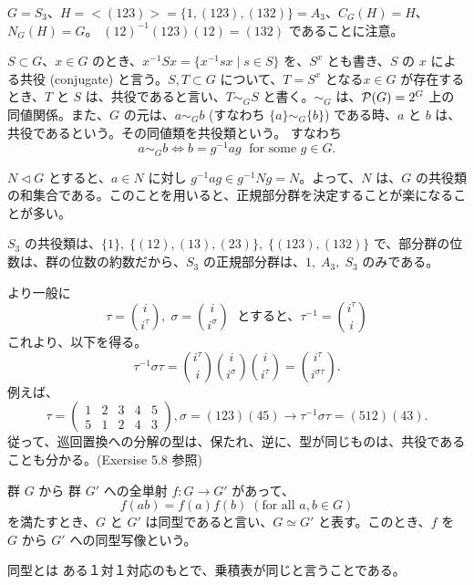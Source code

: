 \begin{eg}
$G = S_3$、$H = <(123)> = \{1,(123),(132)\} = A_3$、$C_G(H) = H$、$N_G(H) = G$。
$(12)^{-1}(123)(12) = (132)$ であることに注意。
\end{eg}

$S \subset G$、$x\in G$ のとき、$x^{-1}Sx = \{x^{-1}sx\mid s\in S\}$ を、$S^x$ とも書き、$S$ の $x$ による共役 (conjugate) と言う。$S, T\subset G$ について、$T = S^x$ となる$x\in G$ が存在するとき、$T$ と $S$ は、共役であると言い、$T\sim_G S$ と書く。$\sim_G$ は、${\cal P}(G) = 2^G$ 上の同値関係。また、$G$ の元は、$a\sim_G b$ (すなわち $\{a\}\sim_G \{b\}$) である時、$a$ と $b$ は、共役であるという。その同値類を共役類という。
すなわち 
$$a\sim_G b\Leftrightarrow b = g^{-1}ag\;\mbox{ for some }g\in G.$$

$N\lhd G$ とすると、$a\in N$ に対し $g^{-1}ag \in g^{-1}Ng = N$。よって、$N$ は、$G$ の共役類の和集合である。このことを用いると、正規部分群を決定することが楽になることが多い。

\begin{eg}
$S_3$ の共役類は、$\{1\}, \;\{(12),(13),(23)\}, \;\{(123),(132)\}$ で、部分群の位数は、群の位数の約数だから、$S_3$ の正規部分群は、$1,\;A_3, \;S_3$ のみである。

\smallskip
より一般に
$$\tau = {i \choose i^{\tau}},\;\sigma = {i\choose i^{\sigma}} \;\mbox{ とすると、}\tau^{-1} = {i^{\tau} \choose i}$$
これより、以下を得る。
$$\tau^{-1}\sigma\tau = {i^{\tau} \choose i}{i\choose i^{\sigma}}{i \choose i^{\tau}} = {i^{\tau}\choose i^{\sigma\tau}}.$$
例えば、
$$\tau = \left(\begin{array}{ccccc}1 & 2 & 3 & 4 & 5 \\ 5 & 1 & 2 & 4 & 3\end{array}\right), 
\sigma = (123)(45) \to \tau^{-1}\sigma\tau = (512)(43).$$
従って、巡回置換への分解の型は、保たれ、逆に、型が同じものは、共役であることも分かる。(Exersise 5.8 参照)
\end{eg}

\newpage
{}
群 $G$ から 群 $G'$ への全単射 $f:G\to G'$ があって、
$$f(ab) = f(a)f(b)\;(\mbox{for all }a,b\in G)$$
を満たすとき、$G$ と $G'$ は同型であると言い、$G\simeq G'$ と表す。このとき、$f$ を $G$ から $G'$ への同型写像という。

\smallskip
同型とは ある１対１対応のもとで、乗積表が同じと言うことである。

